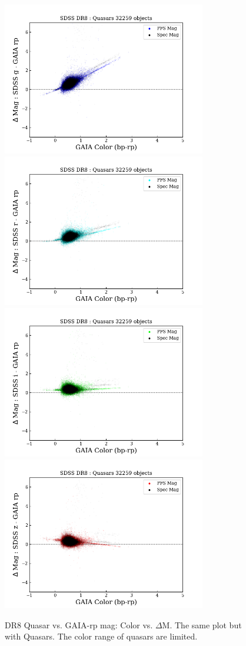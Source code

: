 \documentclass[apj,twocolumn]{aastex631}
\begin{document}
\begin{figure}%
\begin{center}
\includegraphics[angle=0,width=8.9cm]{figures/20220812_color_dmag_g_rp_dr8quasar.png}
\includegraphics[angle=0,width=8.9cm]{figures/20220812_color_dmag_r_rp_dr8quasar.png}
\includegraphics[angle=0,width=8.9cm]{figures/20220812_color_dmag_i_rp_dr8quasar.png}
\includegraphics[angle=0,width=8.9cm]{figures/20220812_color_dmag_z_rp_dr8quasar.png}
\caption{DR8 Quasar vs. GAIA-rp mag: Color vs. $\Delta$M.  The same plot but with Quasars.  The color range of quasars are limited.}
\end{center}
\end{figure}
\end{document}
